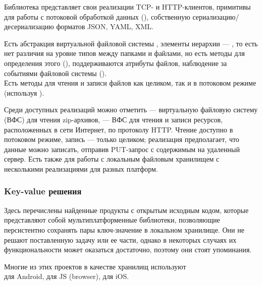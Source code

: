 \begin{itemize}
{                Библиотека представляет свои реализации TCP- и HTTP-клиентов, примитивы для работы с потоковой обработкой данных (), собственную сериализацию/десериализацию форматов JSON, YAML, XML.

                Есть абстракция виртуальной файловой системы , элементы иерархии --- , то есть нет различия на уровне типов между папками и файлами, но есть методы для определения этого (), поддерживаются атрибуты файлов, наблюдение за событиями файловой системы ().\\ Есть методы для чтения и записи файлов как целиком, так и в потоковом режиме (используя ).
                
                Среди доступных реализаций  можно отметить  --- виртуальную файловую систему (ВФС) для чтения zip-архивов,  --- ВФС для чтения и записи ресурсов, расположенных в сети Интернет, по протоколу HTTP. Чтение доступно в потоковом режиме, запись --- только целиком; реализация предполагает, что данные можно записать, отправив PUT-запрос с содержимым на удаленный сервер. Есть также  для работы с локальным файловым хранилищем с несколькими реализациями для разных платформ.
            }
        \end{itemize}

    \subsubsection{Key-value решения}
        Здесь перечислены найденные продукты с открытым исходным кодом, которые представляют собой мультиплатформенные библиотеки, позволяющие персистентно сохранять пары ключ-значение в локальном хранилище. Они не решают поставленную задачу или ее части, однако в некоторых случаях их функциональности может оказаться достаточно, поэтому они стоят упоминания.

        Многие из этих проектов в качестве хранилищ используют\\  для Android,  для JS (browser),  для iOS.

